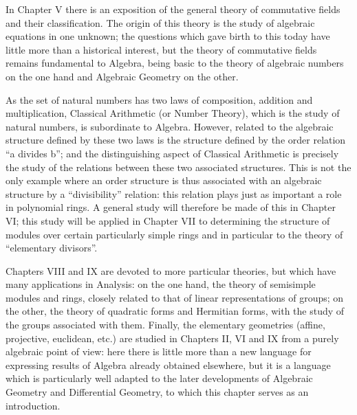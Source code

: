 In Chapter V there is an exposition of the general theory of commutative fields and their classification. The origin of this theory is the study of algebraic equations in one unknown; the questions which gave birth to this today have little more than a historical interest, but the theory of commutative fields remains fundamental to Algebra, being basic to the theory of algebraic numbers on the one hand and Algebraic Geometry on the other.

As the set of natural numbers has two laws of composition, addition and multiplication, Classical Arithmetic (or Number Theory), which is the study of natural numbers, is subordinate to Algebra. However, related to the algebraic structure defined by these two laws is the structure defined by the order relation ``a divides b''; and the distinguishing aspect of Classical Arithmetic is precisely the study of the relations between these two associated structures. This is not the only example where an order structure is thus associated with an algebraic structure by a ``divisibility'' relation: this relation plays just as important a role in polynomial rings. A general study will therefore be made of this in Chapter VI; this study will be applied in Chapter VII to determining the structure of modules over certain particularly simple rings and in particular to the theory of ``elementary divisors''.

Chapters VIII and IX are devoted to more particular theories, but which have many applications in Analysis: on the one hand, the theory of semisimple modules and rings, closely related to that of linear representations of groups; on the other, the theory of quadratic forms and Hermitian forms, with the study of the groups associated with them. Finally, the elementary geometries (affine, projective, euclidean, etc.) are studied in Chapters II, VI and IX from a purely algebraic point of view: here there is little more than a new language for expressing results of Algebra already obtained elsewhere, but it is a language which is particularly well adapted to the later developments of Algebraic Geometry and Differential Geometry, to which this chapter serves as an introduction.
